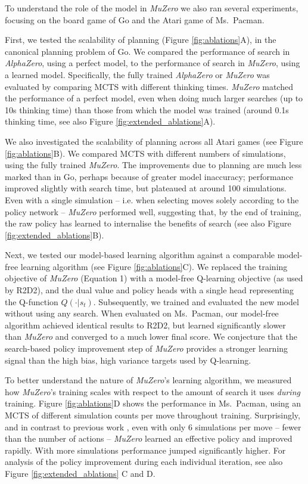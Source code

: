 \documentclass{article}
\newcommand{\muzero}{\emph{MuZero}}
\newcommand{\alphazero}{\emph{AlphaZero}}
\begin{document}
To understand the role of the model in \muzero{} we also ran several experiments, focusing on the board game of Go and the Atari game of Ms.~Pacman.

First, we tested the scalability of planning (Figure \ref{fig:ablations}A), in the canonical planning problem of Go.  We compared the performance of search in \alphazero{}, using a perfect model, to the performance of search in \muzero, using a learned model. Specifically, the fully trained \alphazero{} or \muzero{} was evaluated by comparing MCTS with different thinking times. \muzero{} matched the performance of a perfect model, even when doing much larger searches (up to 10s thinking time) than those from which the model was trained (around 0.1s thinking time, see also Figure \ref{fig:extended_ablations}A).

We also investigated the scalability of planning across all Atari games (see Figure \ref{fig:ablations}B). We compared MCTS with different numbers of simulations, using the fully trained \muzero{}. The improvements due to planning are much less marked than in Go, perhaps because of greater model inaccuracy; performance improved slightly with search time, but plateaued at around 100 simulations. Even with a single simulation -- i.e. when selecting moves solely according to the policy network -- \muzero{} performed well, suggesting that, by the end of training, the raw policy has learned to internalise the benefits of search (see also Figure \ref{fig:extended_ablations}B).

Next, we tested our model-based learning algorithm against a comparable model-free learning algorithm (see Figure \ref{fig:ablations}C). We replaced the training objective of \muzero{} (Equation 1) with a model-free Q-learning objective (as used by R2D2), and the dual value and policy heads with a single head representing the Q-function $Q(\cdot|s_t)$. Subsequently, we trained and evaluated the new model without using any search. When evaluated on Ms.~Pacman, our model-free algorithm achieved identical results to R2D2, but learned significantly slower than \muzero{} and converged to a much lower final score. We conjecture that the search-based policy improvement step of \muzero{} provides a stronger learning signal than the high bias, high variance targets used by Q-learning.

To better understand the nature of \muzero{}'s learning algorithm, we measured how \muzero{}'s training scales with respect to the amount of search it uses \emph{during} training. Figure \ref{fig:ablations}D shows the performance in Ms.~Pacman, using an MCTS of different simulation counts per move throughout training. Surprisingly, and in contrast to previous work \cite{negative_mcts_results}, even with only 6 simulations per move -- fewer than the number of actions -- \muzero{} learned an effective policy and improved rapidly. With more simulations performance jumped significantly higher. For analysis of the policy improvement during each individual iteration, see also Figure \ref{fig:extended_ablations} C and D.
\end{document}
